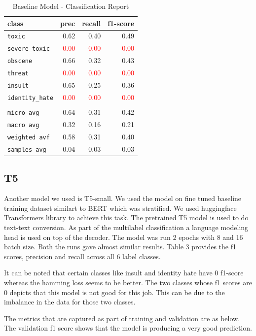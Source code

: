 \documentclass[11pt,a4paper]{article}
\begin{document}
\begin{table}
\centering
\begin{tabular}{lrrr}
\hline
\textbf{class} & \textbf{prec} & \textbf{recall} & \textbf{f1-score}\\
\hline
\verb|toxic| & 0.62 & 0.40 & 0.49 \\
\verb|severe_toxic| & \textcolor{red}{0.00} & \textcolor{red}{0.00} & \textcolor{red}{0.00} \\
\verb|obscene| & 0.66 & 0.32 & 0.43 \\
\verb|threat| & \textcolor{red}{0.00} & \textcolor{red}{0.00} & \textcolor{red}{0.00} \\
\verb|insult| & 0.65 & 0.25 & 0.36 \\
\verb|identity_hate| & \textcolor{red}{0.00} & \textcolor{red}{0.00} & \textcolor{red}{0.00} \\
\vspace{2\baselineskip}\\
\verb|micro avg| & 0.64 & 0.31 & 0.42 \\
\verb|macro avg| & 0.32 & 0.16 & 0.21 \\
\verb|weighted avf| & 0.58 & 0.31 & 0.40 \\
\verb|samples avg| & 0.04 & 0.03 & 0.03 \\
\hline
\end{tabular}
\caption{Baseline Model - Classification Report}
\end{table}


\subsection{T5}
Another model we used is T5-small. We used the model on fine tuned baseline training dataset similart to BERT which was stratified. We used huggingface Transformers library to achieve this task. The pretrained T5 model is used to do text-text conversion. As part of the multilabel classification a language modeling head is used on top of the decoder. The model was run 2 epochs with 8 and 16 batch size. Both the runs gave almost similar results. Table 3 provides the f1 scores, precision and recall across all 6 label classes. 

It can be noted that certain classes like insult and identity hate have 0 f1-score whereas the hamming loss seems to be better. The two classes whose f1 scores are 0 depicts that this model is not good for this job. This can be due to the imbalance in the data for those two classes.


The metrics that are captured as part of training and validation are as below. The validation f1 score shows that the model is producing a very good prediction.
\end{document}

